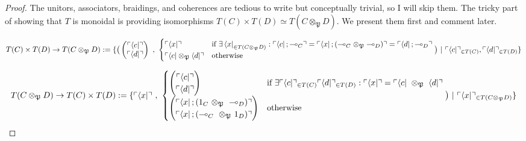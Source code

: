 \begin{fullwidth}
\begin{theorem}
\begin{proof}
The unitors, associators, braidings, and coherences are tedious to write but conceptually trivial, so I will skip them. The tricky part of showing that $T$ is monoidal is providing isomorphisms $T(C) \times T(D) \simeq T(C \otimes_\mathfrak{P} D)$. We present them first and comment later.

\[T(C) \times T(D) \rightarrow T(C \otimes_\mathfrak{P} D) := \{ \big( \begin{pmatrix} \ulcorner \bra{c} \urcorner \\ \ulcorner \bra{d} \urcorner \end{pmatrix} \ , \ \begin{cases}\centering \ulcorner \bra{x} \urcorner & \text{if } \exists \bra{x}_{\in T(C \otimes_\mathfrak{P} D)} : \ulcorner \bra{c};\multimap_C \urcorner = \ulcorner \bra{x};(\multimap_C \otimes_\mathfrak{P} \multimap_{D}) \urcorner = \ulcorner \bra{d};\multimap_D \urcorner \\ \ulcorner \bra{c} \otimes_\mathfrak{P} \bra{d} \urcorner & \text{otherwise} \end{cases} \big) \ | \ \ulcorner \bra{c} \urcorner_{\in T(C)}, \ulcorner \bra{d} \urcorner_{\in T(D)} \}\]

\[T(C \otimes_\mathfrak{P} D) \rightarrow T(C) \times T(D) := \{ \ulcorner \bra{x} \urcorner \ , \ \begin{cases} \begin{pmatrix} \ulcorner \bra{c} \urcorner \\ \ulcorner \bra{d} \urcorner \end{pmatrix} & \text{if }\exists \ulcorner \bra{c} \urcorner_{\in T(C)} \ulcorner \bra{d} \urcorner_{\in T(D)}: \ulcorner \bra{x} \urcorner = \ulcorner \bra{c} \ \otimes_\mathfrak{P} \ \bra{d} \urcorner \\ \begin{pmatrix} \ulcorner \bra{x};(1_C \ \otimes_\mathfrak{P} \ \multimap_D) \urcorner \\ \ulcorner \bra{x};(\multimap_C \ \otimes_\mathfrak{P} \ 1_D) \urcorner \end{pmatrix} & \text{otherwise} \end{cases} \big) \ | \ \ulcorner \bra{x} \urcorner_{\in T(C \otimes_\mathfrak{P} D)} \}\]


\end{proof}
\end{theorem}
\end{fullwidth}

